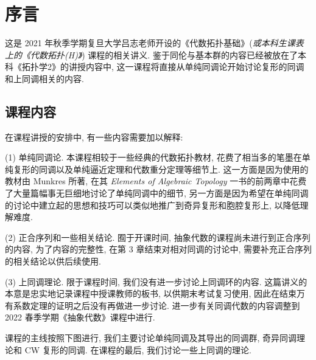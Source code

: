 
\section*{序言}

这是 2021 年秋季学期复旦大学吕志老师开设的《代数拓扑基础》(\textit{或本科生课表上的《代数拓扑(H)》}) 课程的相关讲义. 鉴于同伦与基本群的内容已经被放在了本科《拓扑学2》的讲授内容中, 这一课程将直接从单纯同调论开始讨论复形的同调和上同调相关的内容.

\subsection*{课程内容}

在课程讲授的安排中, 有一些内容需要加以解释:

(1) 单纯同调论. 本课程相较于一些经典的代数拓扑教材, 花费了相当多的笔墨在单纯复形的同调以及单纯逼近定理和代数重分定理等细节上. 这一方面是因为使用的教材由 Munkres 所著, 在其 \textit{Elements of Algebraic Topology} 一书的前两章中花费了大量篇幅事无巨细地讨论了单纯同调中的细节, 另一方面是因为希望在单纯同调的讨论中建立起的思想和技巧可以类似地推广到奇异复形和胞腔复形上, 以降低理解难度.

(2) 正合序列和一些相关结论. 囿于开课时间, 抽象代数的课程尚未进行到正合序列的内容, 为了内容的完整性, 在第 3 章结束对相对同调的讨论中, 需要补充正合序列的相关结论以供后续使用.

(3) 上同调理论. 限于课程时间, 我们没有进一步讨论上同调环的内容. 这篇讲义的本意是忠实地记录课程中授课教师的板书, 以供期末考试复习使用, 因此在结束万有系数定理的证明之后没有再做进一步讨论. 进一步有关同调代数的内容调整到 2022 春季学期《抽象代数》课程中进行.

\newpage

课程的主线按照下图进行, 我们主要讨论单纯同调及其导出的同调群, 奇异同调理论和 CW 复形的同调. 在课程的最后, 我们讨论一些上同调的理论.

\begin{center}
\end{center}

